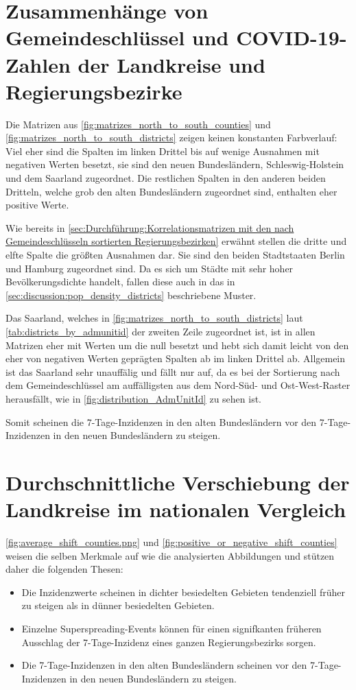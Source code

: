 \section{Zusammenhänge von Gemeindeschlüssel und COVID-19-Zahlen der Landkreise und Regierungsbezirke}
Die Matrizen aus \autoref{fig:matrizes_north_to_south_counties} und \autoref{fig:matrizes_north_to_south_districts} zeigen keinen konstanten Farbverlauf: Viel eher sind die Spalten im linken Drittel bis auf wenige Ausnahmen mit negativen Werten besetzt, sie sind den neuen Bundesländern, Schleswig-Holstein und dem Saarland zugeordnet. Die restlichen Spalten in den anderen beiden Dritteln, welche grob den alten Bundesländern zugeordnet sind, enthalten eher positive Werte.

Wie bereits in \autoref{sec:Durchführung:Korrelationsmatrizen mit den nach Gemeindeschlüsseln sortierten Regierungsbezirken} erwähnt stellen die dritte und elfte Spalte die größten Ausnahmen dar. Sie sind den beiden Stadtstaaten Berlin und Hamburg zugeordnet sind.
Da es sich um Städte mit sehr hoher Bevölkerungsdichte handelt, fallen diese auch in das in \autoref{sec:discussion:pop_density_districts} beschriebene Muster.

Das Saarland, welches in \autoref{fig:matrizes_north_to_south_districts} laut \autoref{tab:districts_by_admunitid} der zweiten Zeile zugeordnet ist, ist in allen Matrizen eher mit Werten um die null besetzt und hebt sich damit leicht von den eher von negativen Werten geprägten Spalten ab im linken Drittel ab.
Allgemein ist das Saarland sehr unauffälig und fällt nur auf, da es bei der Sortierung nach dem Gemeindeschlüssel am auffälligsten aus dem Nord-Süd- und Ost-West-Raster herausfällt, wie in \autoref{fig:distribution_AdmUnitId} zu sehen ist.

Somit scheinen die 7-Tage-Inzidenzen in den alten Bundesländern vor den 7-Tage-Inzidenzen in den neuen Bundesländern zu steigen.

\newpage
\section{Durchschnittliche Verschiebung der Landkreise im nationalen Vergleich}

\autoref{fig:average_shift_counties.png} und
\autoref{fig:positive_or_negative_shift_counties} weisen die selben Merkmale auf wie die analysierten Abbildungen  und stützen daher die folgenden Thesen:

\begin{itemize}
    \item Die Inzidenzwerte scheinen in dichter besiedelten Gebieten tendenziell früher zu steigen als in dünner besiedelten Gebieten.
    \item Einzelne Superspreading-Events können für einen signifkanten früheren Ausschlag der 7-Tage-Inzidenz eines ganzen Regierungsbezirks sorgen.
    \item Die 7-Tage-Inzidenzen in den alten Bundesländern scheinen vor den 7-Tage-Inzidenzen in den neuen Bundesländern zu steigen.
\end{itemize}
